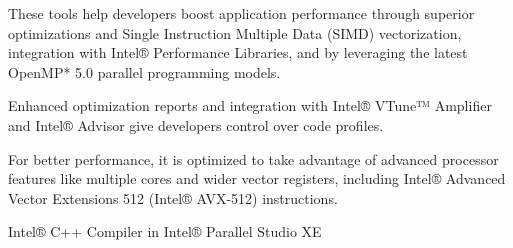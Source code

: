 These tools help developers boost application performance through superior optimizations and Single Instruction Multiple Data (SIMD) vectorization, integration with Intel® Performance Libraries, and by leveraging the latest OpenMP* 5.0 parallel programming models.

Enhanced optimization reports and integration with Intel® VTune™ Amplifier and Intel® Advisor give developers control over code profiles.

For better performance, it is optimized to take advantage of advanced processor features like multiple cores and wider vector registers, including Intel® Advanced Vector Extensions 512 (Intel® AVX-512) instructions. 

Intel® C++ Compiler in Intel® Parallel Studio XE
